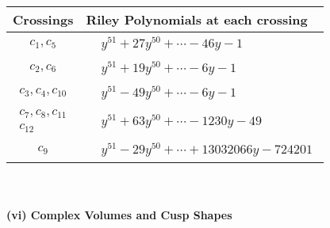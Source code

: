 \documentclass[1p]{elsarticle_modified}
\theoremstyle{definition}
\begin{document}
\begin{tabular}{m{50pt}|m{274pt}}
Crossings & \hspace{64pt}Riley Polynomials at each crossing \\
\hline $$\begin{aligned}c_{1},c_{5}\end{aligned}$$&$\begin{aligned}
&y^{51}+27 y^{50}+\cdots-46 y-1
\end{aligned}$\\
\hline $$\begin{aligned}c_{2},c_{6}\end{aligned}$$&$\begin{aligned}
&y^{51}+19 y^{50}+\cdots-6 y-1
\end{aligned}$\\
\hline $$\begin{aligned}c_{3},c_{4},c_{10}\end{aligned}$$&$\begin{aligned}
&y^{51}-49 y^{50}+\cdots-6 y-1
\end{aligned}$\\
\hline $$\begin{aligned}c_{7},c_{8},c_{11}\\c_{12}\end{aligned}$$&$\begin{aligned}
&y^{51}+63 y^{50}+\cdots-1230 y-49
\end{aligned}$\\
\hline $$\begin{aligned}c_{9}\end{aligned}$$&$\begin{aligned}
&y^{51}-29 y^{50}+\cdots+13032066 y-724201
\end{aligned}$\\
\hline
\end{tabular}\\~\\
\newpage\flushleft \textbf{(vi) Complex Volumes and Cusp Shapes}
\end{document}
